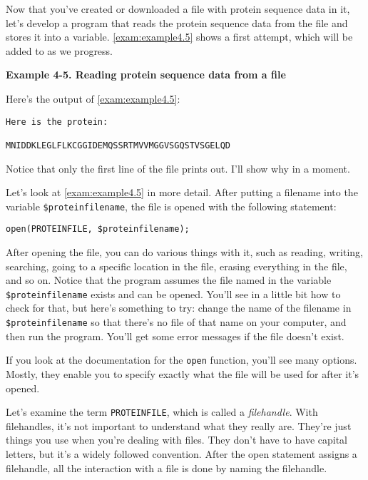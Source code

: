 Now that you've created or downloaded a file with protein sequence data in it, let's develop a program that reads the protein sequence data from the file and stores it into a variable. \autoref{exam:example4.5} shows a first attempt, which will be added to as we progress.

\textbf{Example 4-5. Reading protein sequence data from a file}



Here's the output of \autoref{exam:example4.5}:

\begin{lstlisting}
Here is the protein:

MNIDDKLEGLFLKCGGIDEMQSSRTMVVMGGVSGQSTVSGELQD
\end{lstlisting}

Notice that only the first line of the file prints out. I'll show why in a moment.

Let's look at \autoref{exam:example4.5} in more detail. After putting a filename into the variable \verb|$proteinfilename|, the file is opened with the following statement:

\begin{lstlisting}
open(PROTEINFILE, $proteinfilename);
\end{lstlisting}

After opening the file, you can do various things with it, such as reading, writing, searching, going to a specific location in the file, erasing everything in the file, and so on. Notice that the program assumes the file named in the variable \verb|$proteinfilename| exists and can be opened. You'll see in a little bit how to check for that, but here's something to try: change the name of the filename in \verb|$proteinfilename| so that there's no file of that name on your computer, and then run the program. You'll get some error messages if the file doesn't exist.

If you look at the documentation for the \verb|open| function, you'll see many options. Mostly, they enable you to specify exactly what the file will be used for after it's opened.

Let's examine the term \verb|PROTEINFILE|, which is called a \textit{filehandle}. With filehandles, it's not important to understand what they really are.  They're just things you use when you're dealing with files. They don't have to have capital letters, but it's a widely followed convention.  After the open statement assigns a filehandle, all the interaction with a file is done by naming the filehandle.  

